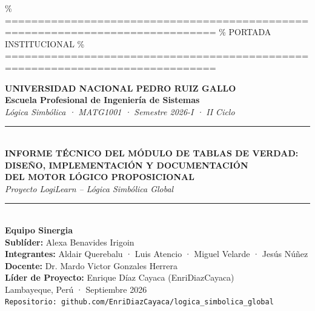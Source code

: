 \documentclass[11pt,a4paper]{article}
\begin{document}
\% ==============================================================================
\% PORTADA INSTITUCIONAL
\% ==============================================================================
\begin{titlepage}
\begin{center}
  \textbf{\large UNIVERSIDAD NACIONAL PEDRO RUIZ GALLO}\\[0.2cm]
  \textbf{\normalsize Escuela Profesional de Ingeniería de Sistemas}\\[0.2cm]
  \textit{\small Lógica Simbólica · MATG1001 · Semestre 2026-I · II Ciclo}\\[1.5cm]

  \rule{\textwidth}{1.5pt}\\[0.4cm]
  {\Large \textbf{INFORME TÉCNICO DEL MÓDULO DE TABLAS DE VERDAD:}}\\[0.2cm]
  {\Large \textbf{DISEÑO, IMPLEMENTACIÓN Y DOCUMENTACIÓN}}\\[0.2cm]
  {\Large \textbf{DEL MOTOR LÓGICO PROPOSICIONAL}}\\[0.4cm]
  \textit{\large Proyecto LogiLearn -- Lógica Simbólica Global}\\[0.4cm]
  \rule{\textwidth}{1.5pt}\\[1.5cm]

  \textbf{\large Equipo Sinergia}\\[0.4cm]
  \textbf{Sublíder:} Alexa Benavides Irigoin\\[0.2cm]
  \textbf{Integrantes:} Aldair Querebalu · Luis Atencio · Miguel Velarde · Jesús Núñez\\[1.0cm]

  \textbf{Docente:} Dr. Mardo Victor Gonzales Herrera\\[0.2cm]
  \textbf{Líder de Proyecto:} Enrique Díaz Cayaca (EnriDiazCayaca)\\[1.5cm]

  \vfill
  Lambayeque, Perú · Septiembre 2026\\[0.2cm]
  \small\texttt{Repositorio: github.com/EnriDiazCayaca/logica\_simbolica\_global}
\end{center}
\end{titlepage}
\end{document}
